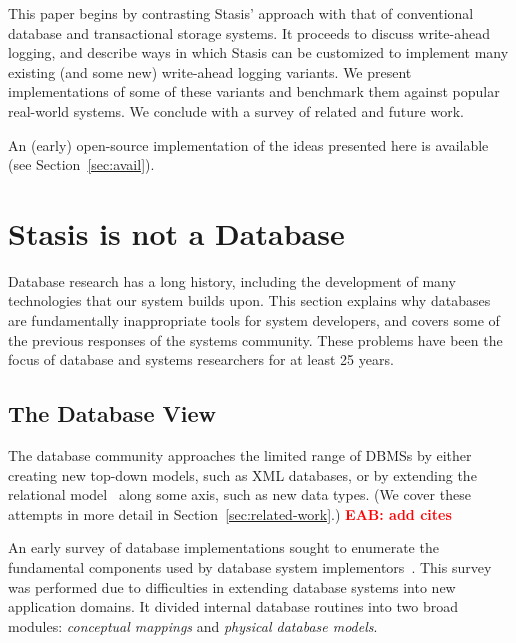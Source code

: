 \documentclass[letterpaper,twocolumn,10pt]{article}
\newcommand{\yad}{Stasis\xspace}
\newcommand{\yads}{Stasis'\xspace}
\newcommand{\eab}[1]{\textcolor{red}{\bf EAB: #1}}
\begin{document}

This paper begins by contrasting \yads approach with that of
conventional database and transactional storage systems.  It proceeds
to discuss write-ahead logging, and describe ways in which \yad can be
customized to implement many existing (and some new) write-ahead
logging variants.  We present implementations of some of these variants and
benchmark them against popular real-world systems.  We
conclude with a survey of related and future work.

An (early) open-source implementation of
the ideas presented here is available (see Section~\ref{sec:avail}).

\section{\yad is not a Database}
\label{sec:notDB}

Database research has a long history, including the development of
many technologies that our system builds upon.  This section explains
why databases are fundamentally inappropriate tools for system
developers, and covers some of the previous responses of the systems
community.  These problems have been the focus of
database and systems researchers for at least 25 years.

\subsection{The Database View}

The database community approaches the limited range of DBMSs by either
creating new top-down models, such as XML databases, 
or by extending the relational model~\cite{codd} along some axis, such
as new data types.  (We cover these attempts in more detail in
Section~\ref{sec:related-work}.) \eab{add cites}


An early survey of database implementations sought to enumerate the
fundamental components used by database system implementors~\cite{batoryConceptual,batoryPhysical}.  This
survey was performed due to difficulties in extending database systems
into new application domains.  It divided internal database
routines into two broad modules: {\em conceptual mappings} and {\em physical
database models}.
\end{document}
